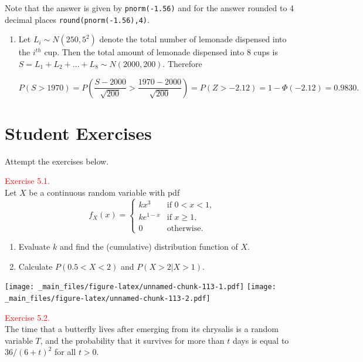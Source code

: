 \documentclass[
]{book}
\providecommand{\tightlist}{%
  \setlength{\itemsep}{0pt}\setlength{\parskip}{0pt}}
\begin{document}
Note that the answer is given by \texttt{pnorm(-1.56)} and for the answer rounded to 4 decimal places \texttt{round(pnorm(-1.56),4)}.

\begin{enumerate}
\def\labelenumi{(\alph{enumi})}
\setcounter{enumi}{1}
\tightlist
\item
  Let \(L_i \sim N(250,5^2)\) denote the total number of lemonade dispensed into the \(i^{th}\) cup. Then the total amount of lemonade dispensed into 8 cups is \(S = L_1 + L_2 + \ldots + L_8 \sim N (2000,200)\). Therefore

  \[ P(S >1970) = P \left( \frac{S -2000}{\sqrt{200}} >\frac{1970 -2000}{\sqrt{200}} \right) = P(Z>-2.12) = 1 - \Phi (-2.12) = 0.9830. \]
\end{enumerate}

\hfill\break

\hypertarget{prob:lab}{%
\section*{\texorpdfstring{{\textbf{Student Exercises}}}{Student Exercises}}\label{prob:lab}}

Attempt the exercises below.

\leavevmode{}%
\textcolor{red}{Exercise 5.1.}\\
Let \(X\) be a continuous random variable with pdf
\[ f_X(x)= \left\{ \begin{array}{ll} k x^3 & \text{if } 0<x<1, \\
k e^{1-x} & \text{if } x \ge 1, \\
0 & \text{otherwise.} \end{array} \right.\]

\begin{enumerate}
\def\labelenumi{(\alph{enumi})}
\tightlist
\item
  Evaluate \(k\) and find the (cumulative) distribution function of \(X\).\\
\item
  Calculate \(P (0.5<X<2)\) and \(P(X>2|X>1)\).
\end{enumerate}

\texttt{[image: \_main\_files/figure-latex/unnamed-chunk-113-1.pdf]} \texttt{[image: \_main\_files/figure-latex/unnamed-chunk-113-2.pdf]}

\hfill\break

\leavevmode{}%
\textcolor{red}{Exercise 5.2.}\\
The time that a butterfly lives after emerging from its chrysalis is a random variable \(T\), and the probability that it survives for more than \(t\) days is equal to \(36/(6+t)^2\) for all \(t>0\).
\end{document}

